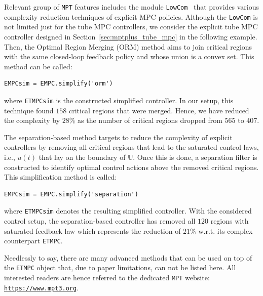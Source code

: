 \documentclass[letterpaper, 10 pt, conference]{ieeeconf}
\begin{document}
Relevant group of \texttt{MPT} features includes the module \texttt{LowCom}~\cite{KH15} that provides various complexity reduction techniques of explicit MPC policies. Although the \texttt{LowCom} is not limited just for the tube MPC controllers, we consider the explicit tube MPC controller designed in Section~\ref{sec:mptplus_tube_mpc} in the following example. Then, the Optimal Region Merging (ORM) method aims to join critical regions with the same closed-loop feedback policy and whose union is a convex set. This method can be called: 
\begin{lstlisting}[style=Matlab-editor]
EMPCsim = EMPC.simplify('orm')
\end{lstlisting}
where \verb|ETMPCsim| is the constructed simplified controller. In our setup, this technique found $158$ critical regions that were merged. Hence, we have reduced the complexity by $28\%$ as the number of critical regions dropped from $565$ to $407$. 

%
%
The separation-based method targets to reduce the complexity of explicit controllers by removing all critical regions that lead to the saturated control laws, i.e., $u(t)$ that lay on the boundary of $\mathbb{U}$. Once this is done, a separation filter is constructed to identify optimal control actions above the removed critical regions. This simplification method is called:
\begin{lstlisting}[style=Matlab-editor]
EMPCsim = EMPC.simplify('separation')
\end{lstlisting}
where \verb|ETMPCsim| denotes the resulting simplified controller. With the considered control setup, the separation-based controller has removed all $120$ regions with saturated feedback law which represents the reduction of $21\%$ w.r.t. its complex counterpart \verb|ETMPC|.

Needlessly to say, there are many advanced methods that can be used on top of the \verb|ETMPC| object that, due to paper limitations, can not be listed here. All interested readers are hence referred to the dedicated \texttt{MPT} website: \\ \texttt{\url{https://www.mpt3.org}}.
\end{document}
